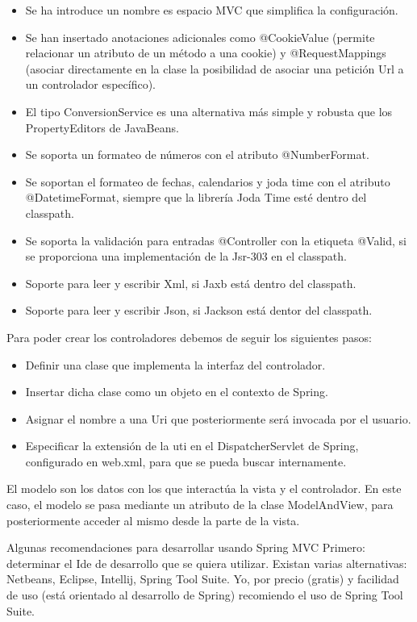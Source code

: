 \begin{itemize}
		\begin{itemize}
			\item Se ha introduce un nombre es espacio MVC que simplifica la configuración.
			\item Se han insertado anotaciones adicionales como @CookieValue (permite relacionar un atributo de un método a una cookie) y @RequestMappings (asociar directamente en la clase la posibilidad de asociar una petición Url a un controlador específico).
			\item El tipo ConversionService es una alternativa más simple y robusta que los PropertyEditors de JavaBeans.
			\item Se soporta un formateo de números con el atributo @NumberFormat.
			\item Se soportan el formateo de fechas, calendarios y joda time con el atributo @DatetimeFormat, siempre que la librería Joda Time esté dentro del classpath.
			\item Se soporta la validación para entradas @Controller con la etiqueta @Valid, si se proporciona una implementación de la Jsr-303 en el classpath.
			\item Soporte para leer y escribir Xml, si Jaxb está dentro del classpath.
			\item Soporte para leer y escribir Json, si Jackson está dentor del classpath.
		\end{itemize}
		Para poder crear los controladores debemos de seguir los siguientes pasos:
		\begin{itemize}
			\item Definir una clase que implementa la interfaz del controlador.
			\item Insertar dicha clase como un objeto en el contexto de Spring.
			\item Asignar el nombre a una Uri que posteriormente será invocada por el usuario.
			\item Especificar la extensión de la uti en el DispatcherServlet de Spring, configurado en web.xml, para que se pueda buscar internamente.
		\end{itemize}
		
		El modelo son los datos con los que interactúa la vista y el controlador. En este caso, el modelo se pasa mediante un atributo de la clase ModelAndView, para posteriormente acceder al mismo desde la parte de la vista. \cite{introspring}
		
		Algunas recomendaciones para desarrollar usando Spring MVC
		Primero: determinar el Ide de desarrollo que se quiera utilizar. Existan varias alternativas: Netbeans, Eclipse, Intellij, Spring Tool Suite. Yo, por precio (gratis) y facilidad de uso (está orientado al desarrollo de Spring) recomiendo el uso de Spring Tool Suite. \\
		

\end{itemize}
